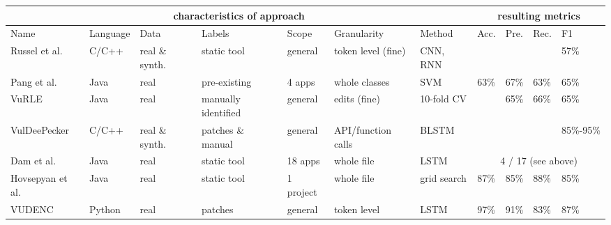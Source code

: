 \documentclass[
a4paper,
pagesize,
pdftex,
12pt,
ngerman,
fleqn,
final,
]{scrartcl}
\begin{document}
	\scriptsize
	\begin{tabular}{ | p{1.8cm} | p{1.2cm}|  p{0.7cm}| p{1.4cm} |  p{1.2cm} | p{1.5cm} | p{1.1cm} || p{0.4cm}|p{0.4cm}|p{0.4cm}|p{0.4cm}|  }
		\hline
		\multicolumn{7}{|c||}{characteristics of approach} & \multicolumn{4}{c|}{resulting metrics} \\
		\hline
		Name &  Language & Data & Labels & Scope &Granularity & Method & Acc. & Pre. & Rec. & F1  \\
		\hline
		Russel et al. & C/C++ & real \& synth. & static tool & general & token level (fine) & CNN, RNN &  &   &   &  57\%  \\
		\hline
		Pang et al. & Java & real  & pre-existing  & 4 apps & whole classes & SVM & 63\% & 67\%  & 63\%  & 65\%    \\
		\hline
		VuRLE & Java & real  & manually identified  & general & edits (fine) & 10-fold CV &  & 65\%  & 66\%  & 65\%    \\
		\hline
		VulDeePecker & C/C++ & real \& synth.  & patches \& manual & general & API/function calls & BLSTM &  &   &  & 85\%-95\%    \\
		\hline
		Dam et al. & Java & real &static tool & 18 apps & whole file & LSTM & \multicolumn{4}{c|}{ 4 / 17 (see above)}   \\
		\hline
		Hovsepyan et al. & Java & real  &static tool  & 1 project & whole file & grid search & 87\% & 	85\%  & 88\%  & 85\%   \\
		\hline
		VUDENC & Python & real  &patches& general  & token level & LSTM & 97\% & 91\% & 83\% & 87\%   \\
		\hline
		\hline 
	\end{tabular}\\
	\normalsize
	
\end{document}
